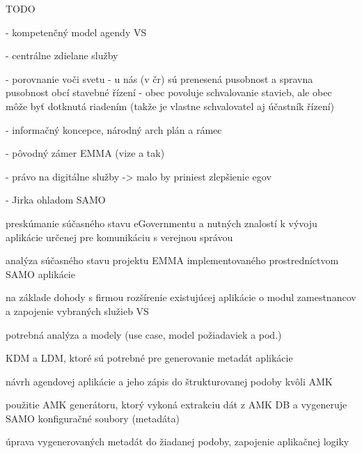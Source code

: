 
\TODO
TODO

- kompetenčný model agendy VS

- centrálne zdielane služby

- porovnanie voči svetu - u nás (v čr) sú prenesená pusobnost a spravna pusobnost obcí
stavebné řízení - obec povoluje schvalovanie stavieb, ale obec môže byť dotknutá riadením (takže je vlastne schvalovatel aj účastník řízení)

- informačný koncepce, národný arch plán a rámec

- pôvodný zámer EMMA (vize a tak)

- právo na digitálne služby -> malo by priniest zlepšienie egov

- Jirka ohladom SAMO


\startitemize[n]
\item{preskúmanie súčasného stavu eGovernmentu a nutných znalostí k vývoju aplikácie určenej pre komunikáciu s verejnou správou}
\item{analýza súčasného stavu projektu EMMA implementovaného prostredníctvom SAMO aplikácie}
\item{na základe dohody s firmou rozšírenie existujúcej aplikácie o modul zamestnancov a zapojenie vybraných služieb VS}
\startitemize[a]
\item{potrebná analýza a modely (use case, model požiadaviek a pod.)}
\item{KDM a LDM, ktoré sú potrebné pre generovanie metadát aplikácie}
\item{návrh agendovej aplikácie a jeho zápis do štrukturovanej podoby kvôli AMK}
\item{použitie AMK generátoru, ktorý vykoná extrakciu dát z AMK DB a vygeneruje SAMO konfiguračné soubory (metadáta)}
\item{úprava vygenerovaných metadát do žiadanej podoby, zapojenie aplikačnej logiky}
\stopitemize
\stopitemize


